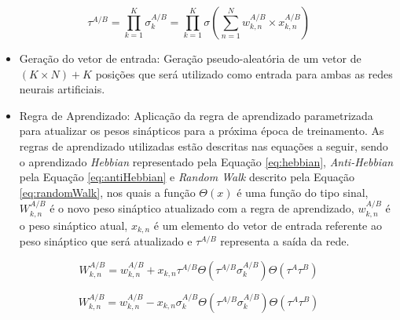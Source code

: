 \documentclass[12pt]{article}
\begin{document}
        \begin{equation}
            \label{eq:tpmOutput}
            \tau^{A/B} = \displaystyle\prod_{k=1}^{K} \sigma_{k}^{A/B} = \displaystyle\prod_{k=1}^{K} \sigma \left (\displaystyle\sum_{n=1}^{N} w_{k,n}^{A/B} \times x_{k,n}^{A/B} \right )
        \end{equation}
    
        \begin{itemize}
            
            \item Geração do vetor de entrada:
            Geração pseudo-aleatória de um vetor de $(K \times N) + K$ posições que será utilizado como entrada para ambas as redes neurais artificiais.
                
            \item Regra de Aprendizado:
            Aplicação da regra de aprendizado parametrizada para atualizar os pesos sinápticos para a próxima época de treinamento. As regras de aprendizado utilizadas estão descritas nas equações a seguir, sendo o aprendizado \textit{Hebbian} representado pela Equação \eqref{eq:hebbian}, \textit{Anti-Hebbian} pela Equação \eqref{eq:antiHebbian} e \textit{Random Walk} descrito pela Equação \eqref{eq:randomWalk}, nos quais a função \textit{$\Theta(x)$} é uma função do tipo sinal, $W^{A/B}_{k,n}$ é o novo peso sináptico atualizado com a regra de aprendizado, $w^{A/B}_{k,n}$ é o peso sináptico atual, $x_{k,n}$ é um elemento do vetor de entrada referente ao peso sináptico que será atualizado e $\tau^{A/B}$ representa a saída da rede.
            
        \end{itemize}
            
        \begin{equation}
            \label{eq:hebbian}
            W_{k,n}^{A/B} = w_{k,n}^{A/B} + x_{k,n} \tau^{A/B} \Theta(\tau^{A/B} \sigma_{k}^{A/B}) \Theta(\tau^{A} \tau^{B})
        \end{equation}
            
        \begin{equation}
            \label{eq:antiHebbian}
            W_{k,n}^{A/B} = w_{k,n}^{A/B} - x_{k,n} \sigma_{k}^{A/B} \Theta(\tau^{A/B} \sigma_{k}^{A/B}) \Theta(\tau^{A} \tau^{B})
        \end{equation}
            
\end{document}
